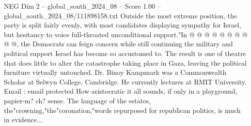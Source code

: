 \begin{textsample}{NEG Dim 2 – global\_south\_2024\_08 – Score 1.00 – global\_south\_2024\_08/111898158.txt}
Outside the most extreme position, the party is split fairly evenly, with most candidates displaying sympathy for Israel, but hesitancy to voice full-throated unconditional support."In @ @ @ @ @ @ @ @ @ @, the Democrats can feign concern while still continuing the military and political support Israel has become so accustomed to.
The result is one of theatre that does little to alter the catastrophe taking place in Gaza, leaving the political furniture virtually untouched.
Dr.
Binoy Kampmark was a Commonwealth Scholar at Selwyn College, Cambridge.
He currently lectures at RMIT University.
Email : email protected How aristocratic it all sounds, if only in a playground, papier-m? ch? sense.
The language of the estates, the"crowning,"the"coronation,"words repurposed for republican politics, is much in evidence...

\end{textsample}
